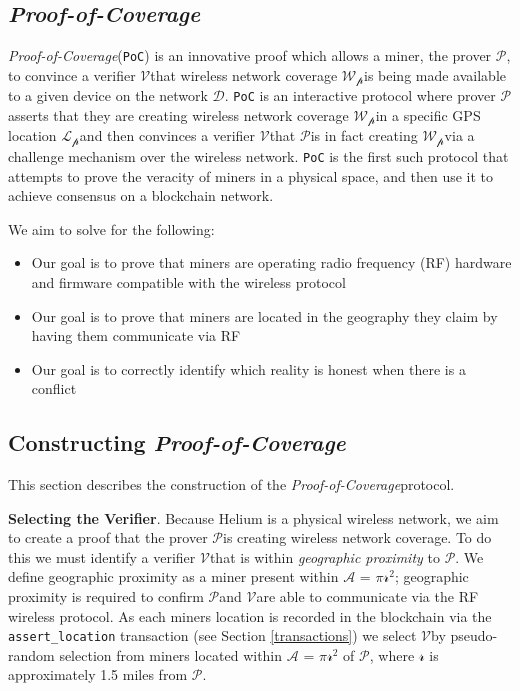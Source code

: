 \documentclass[letterpaper,11pt]{report}
\newcommand{\prover}{$\mathcal{P}$}
\newcommand{\verifier}{$\mathcal{V}$}
\newcommand{\coverage}{$\mathcal{W_p}$}
\newcommand{\device}{$\mathcal{D}$}
\newcommand{\location}{$\mathcal{L_p}$}
\newcommand{\proofofcoverage}{\textit{Proof-of-Coverage}}
\begin{document}
\subsection{\proofofcoverage}

\proofofcoverage (\verb|PoC|) is an innovative proof which allows a miner, the prover \prover, to convince a verifier \verifier that wireless network coverage \coverage is being made available to a given device on the network \device. \verb|PoC| is an interactive protocol where prover \prover asserts that they are creating wireless network coverage \coverage in a specific GPS location \location and then convinces a verifier \verifier that \prover is in fact creating \coverage via a challenge mechanism over the wireless network. \verb|PoC| is the first such protocol that attempts to prove the veracity of miners in a physical space, and then use it to achieve consensus on a blockchain network.\newline

We aim to solve for the following:

\begin{itemize}
	\item Our goal is to prove that miners are operating radio frequency (RF) hardware and firmware compatible with the wireless protocol	
	\item Our goal is to prove that miners are located in the geography they claim by having them communicate via RF
	\item Our goal is to correctly identify which reality is honest when there is a conflict
\end{itemize}

\subsection{Constructing \proofofcoverage}

This section describes the construction of the \proofofcoverage protocol.\newline

\textbf{Selecting the Verifier}. Because Helium is a physical wireless network, we aim to create a proof that the prover \prover is creating wireless network coverage. To do this we must identify a verifier \verifier that is within \textit{geographic proximity} to \prover. We define geographic proximity as a miner present within $\mathcal{A}$ = $\mathcal{\pi}$$\mathcal{r^2}$; geographic proximity is required to confirm \prover and \verifier are able to communicate via the RF wireless protocol. As each miners location is recorded in the blockchain via the \verb|assert_location| transaction (see Section \ref{transactions}) we select \verifier by pseudo-random selection from miners located within $\mathcal{A}$ = $\mathcal{\pi}$$\mathcal{r^2}$ of \prover, where $\mathcal{r}$ is approximately 1.5 miles from \prover.\newline
\end{document}
